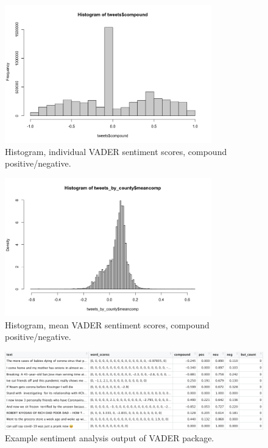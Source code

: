 \documentclass{article}
\begin{document}
\begin{figure}[h!]
  \includegraphics[width=0.8\textwidth]{figs/compound_hist.png}    
  \centering
  \caption{Histogram, individual VADER sentiment scores, compound positive/negative.}
  \label{comp_hist}
  
\end{figure}

\begin{figure}[h!]
  \includegraphics[width=0.8\textwidth]{figs/meancomp_hist.png}    
  \centering
  \caption{Histogram, mean VADER sentiment scores, compound positive/negative.}
  \label{meancomp_hist}
\end{figure}





\begin{landscape}
  \vspace{1.5in}
  \begin{figure}[h!]
    \includegraphics[width=\textwidth]{figs/vader-table.png}    
    \centering
    \caption{Example sentiment analysis output of VADER package.}
  \end{figure}
  \end{landscape}
\end{document}
